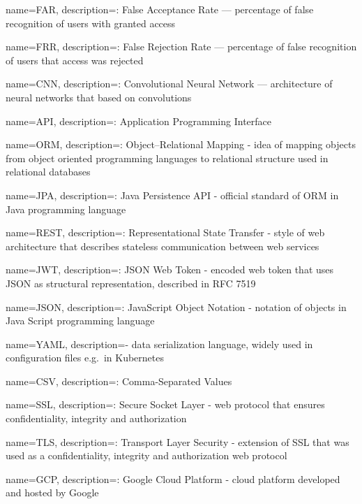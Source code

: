 \makeglossaries

{
name=FAR,
description={: False Acceptance Rate --- percentage of false recognition of users with granted access}
}

{
name=FRR,
description={: False Rejection Rate --- percentage of false recognition of users that access was rejected}
}

{
name=CNN,
description={: Convolutional Neural Network --- architecture of neural networks that based on convolutions}
}

{
name=API,
description={: Application Programming Interface}
}

{
name=ORM,
description={: Object–Relational Mapping - idea of mapping objects from object oriented programming languages to relational structure used in relational databases}
}

{
name=JPA,
description={: Java Persistence API - official standard of ORM in Java programming language}
}

{
name=REST,
description={: Representational State Transfer - style of web architecture that describes stateless communication between web services}
}

{
name=JWT,
description={: JSON Web Token - encoded web token that uses JSON as structural representation, described in RFC 7519}
}

{
name=JSON,
description={: JavaScript Object Notation - notation of objects in Java Script programming language}
}

{
name=YAML,
description={- data serialization language, widely used in configuration files e.g.\ in Kubernetes}
}

{
name=CSV,
description={: Comma-Separated Values}
}

{
name=SSL,
description={: Secure Socket Layer - web protocol that ensures confidentiality, integrity and authorization}
}

{
name=TLS,
description={: Transport Layer Security - extension of SSL that was used as a confidentiality, integrity and authorization web protocol}
}

{
name=GCP,
description={: Google Cloud Platform - cloud platform developed and hosted by Google}
}

